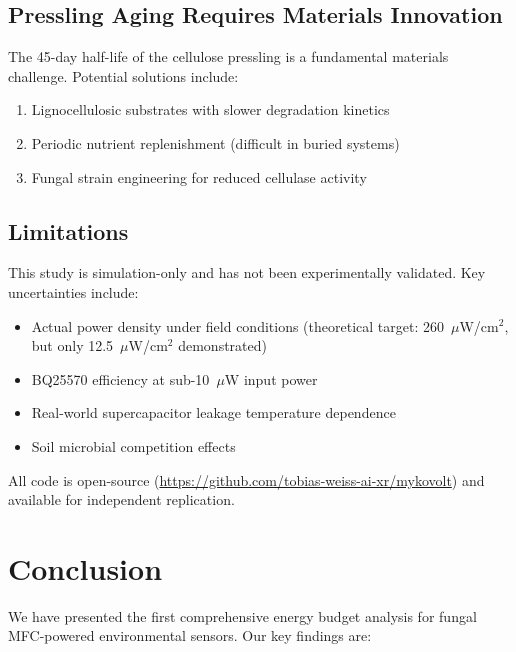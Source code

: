\documentclass[twocolumn,10pt,a4paper]{article}
\begin{document}
\subsection{Pressling Aging Requires Materials Innovation}

The 45-day half-life of the cellulose pressling is a fundamental materials
challenge. Potential solutions include:
\begin{enumerate}
    \item Lignocellulosic substrates with slower degradation kinetics
    \item Periodic nutrient replenishment (difficult in buried systems)
    \item Fungal strain engineering for reduced cellulase activity
\end{enumerate}

\subsection{Limitations}

This study is simulation-only and has not been experimentally validated. Key
uncertainties include:
\begin{itemize}
    \item Actual power density under field conditions (theoretical target:
          260~$\mu$W/cm$^2$, but only 12.5~$\mu$W/cm$^2$ demonstrated)
    \item BQ25570 efficiency at sub-10~$\mu$W input power
    \item Real-world supercapacitor leakage temperature dependence
    \item Soil microbial competition effects
\end{itemize}

All code is open-source (\url{https://github.com/tobias-weiss-ai-xr/mykovolt})
and available for independent replication.

\section{Conclusion}
\label{sec:conclusion}

We have presented the first comprehensive energy budget analysis for
fungal MFC-powered environmental sensors. Our key findings are:
\end{document}
